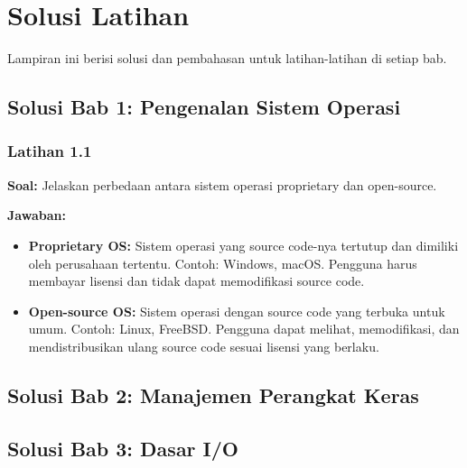 
\chapter{Solusi Latihan}
\label{app:exercise-solutions}

Lampiran ini berisi solusi dan pembahasan untuk latihan-latihan di setiap bab.

\section{Solusi Bab 1: Pengenalan Sistem Operasi}

\subsection{Latihan 1.1}
\textbf{Soal:} Jelaskan perbedaan antara sistem operasi proprietary dan open-source.

\textbf{Jawaban:}
\begin{itemize}
    \item \textbf{Proprietary OS:} Sistem operasi yang source code-nya tertutup dan
          dimiliki oleh perusahaan tertentu. Contoh: Windows, macOS. Pengguna harus
          membayar lisensi dan tidak dapat memodifikasi source code.

    \item \textbf{Open-source OS:} Sistem operasi dengan source code yang terbuka
          untuk umum. Contoh: Linux, FreeBSD. Pengguna dapat melihat, memodifikasi,
          dan mendistribusikan ulang source code sesuai lisensi yang berlaku.
\end{itemize}


\section{Solusi Bab 2: Manajemen Perangkat Keras}


\section{Solusi Bab 3: Dasar I/O}



